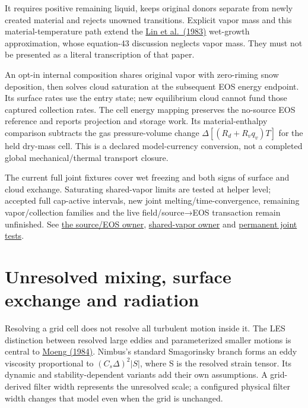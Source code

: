 \documentclass[
  11pt,
]{report}
\begin{document}
It requires positive remaining liquid, keeps original donors separate
from newly created material and rejects unowned transitions. Explicit
vapor mass and this material-temperature path extend the
\href{https://www.atmos.albany.edu/facstaff/rfovell/ATM562/lin-etal-1983.pdf}{Lin
et al.~(1983)} wet-growth approximation, whose equation-43 discussion
neglects vapor mass. They must not be presented as a literal
transcription of that paper.

An opt-in internal composition shares original vapor with zero-riming
snow deposition, then solves cloud saturation at the subsequent EOS
energy endpoint. Its surface rates use the entry state; new equilibrium
cloud cannot fund those captured collection rates. The cell energy
mapping preserves the no-source EOS reference and reports projection and
storage work. Its material-enthalpy comparison subtracts the gas
pressure-volume change \(\Delta[(R_d+R_vq_v)T]\) for the held dry-mass
cell. This is a declared model-currency conversion, not a completed
global mechanical/thermal transport closure.

The current full joint fixtures cover wet freezing and both signs of
surface and cloud exchange. Saturating shared-vapor limits are tested at
helper level; accepted full cap-active intervals, new joint
melting/time-convergence, remaining vapor/collection families and the
live field/source→EOS transaction remain unfinished. See
\href{../src/microphysics/schemes/milbrandt/triple_source_eos_energy.hpp}{the
source/EOS owner},
\href{../src/microphysics/schemes/milbrandt/triple_hail_shared_vapor.hpp}{shared-vapor
owner} and
\href{../tests/physics/test_milbrandt_triple_hail_shared_vapor.cpp}{permanent
joint tests}.

\section{Unresolved mixing, surface exchange and
radiation}\label{unresolved-mixing-surface-exchange-and-radiation}

Resolving a grid cell does not resolve all turbulent motion inside it.
The LES distinction between resolved large eddies and parameterized
smaller motions is central to
\href{https://journals.ametsoc.org/view/journals/atsc/41/13/1520-0469_1984_041_2052_alesmf_2_0_co_2.xml}{Moeng
(1984)}. Nimbus's standard Smagorinsky branch forms an eddy viscosity
proportional to \((C_s\Delta)^2|S|\), where S is the resolved strain
tensor. Its dynamic and stability-dependent variants add their own
assumptions. A grid-derived filter width represents the unresolved
scale; a configured physical filter width changes that model even when
the grid is unchanged.
\end{document}
